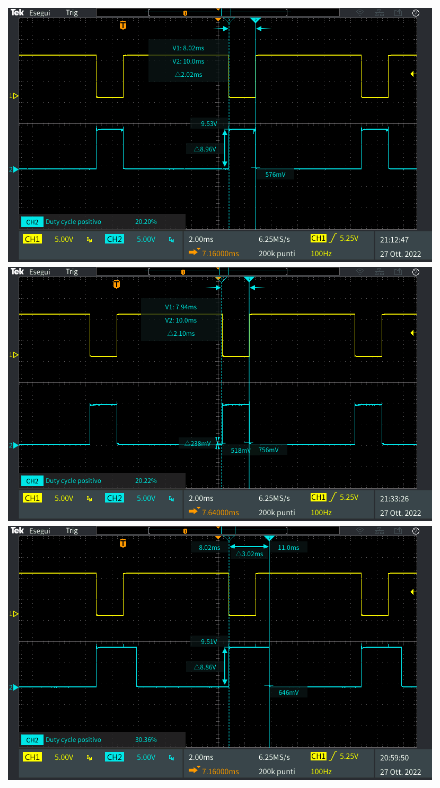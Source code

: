 \begin{figure}[h]
	\centering
	\begin{minipage}{.496\textwidth}
		\includegraphics[width=\linewidth]{./ImageFiles/Laboratorio 4/TEK00017.PNG}
	\end{minipage}
	\begin{minipage}{.496\textwidth}
		\includegraphics[width=\linewidth]{./ImageFiles/Laboratorio 4/TEK00021.PNG}
	\end{minipage}
	\begin{minipage}{.496\textwidth}
		\includegraphics[width=\linewidth]{./ImageFiles/Laboratorio 4/TEK00012.PNG}

\end{minipage}
\end{figure}
